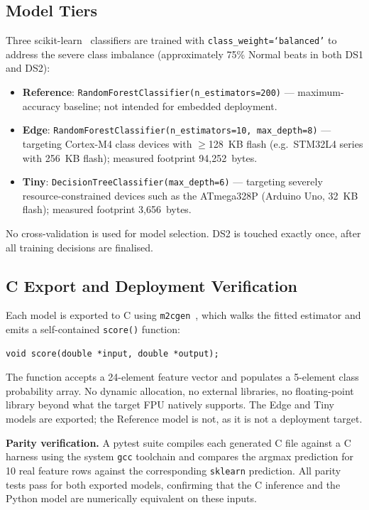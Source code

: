 \documentclass[journal,twoside]{IEEEtran}
\begin{document}
\subsection{Model Tiers}

Three scikit-learn~\cite{scikit-learn} classifiers are trained with
\texttt{class\_weight=`balanced'} to address the severe class imbalance
(approximately 75\% Normal beats in both DS1 and DS2):

\begin{itemize}
  \item \textbf{Reference}: \texttt{RandomForestClassifier(n\_estimators=200)}
        — maximum-accuracy baseline; not intended for embedded deployment.
  \item \textbf{Edge}: \texttt{RandomForestClassifier(n\_estimators=10,
        max\_depth=8)} — targeting Cortex-M4 class devices with $\ge$128~KB
        flash (e.g.\ STM32L4 series with 256~KB flash); measured footprint
        94{,}252~bytes.
  \item \textbf{Tiny}: \texttt{DecisionTreeClassifier(max\_depth=6)}
        — targeting severely resource-constrained devices such as the
        ATmega328P (Arduino Uno, 32~KB flash); measured footprint
        3{,}656~bytes.
\end{itemize}

No cross-validation is used for model selection. DS2 is touched exactly
once, after all training decisions are finalised.

\subsection{C Export and Deployment Verification}

Each model is exported to C using \texttt{m2cgen}~\cite{m2cgen}, which
walks the fitted estimator and emits a self-contained \texttt{score()}
function:

\begin{verbatim}
void score(double *input, double *output);
\end{verbatim}

\noindent The function accepts a 24-element feature vector and populates a
5-element class probability array. No dynamic allocation, no external
libraries, no floating-point library beyond what the target FPU natively
supports. The Edge and Tiny models are exported; the Reference model is
not, as it is not a deployment target.

\textbf{Parity verification.} A pytest suite compiles each generated C
file against a C harness using the system \texttt{gcc} toolchain and
compares the argmax prediction for 10 real feature rows against the
corresponding \texttt{sklearn} prediction. All parity tests pass for both
exported models, confirming that the C inference and the Python model are
numerically equivalent on these inputs.
\end{document}

